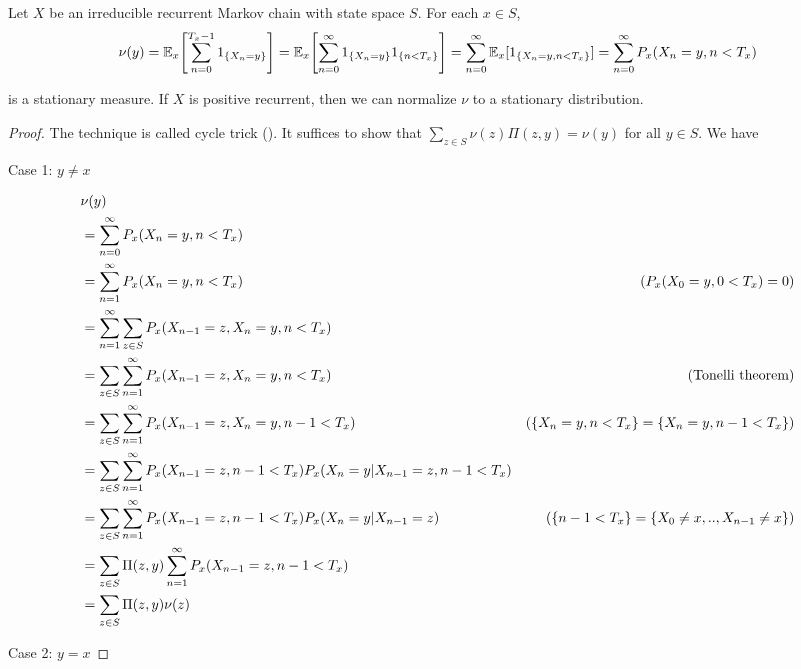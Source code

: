 \documentclass{report}
\begin{document}
\begin{theorem}
    Let $X$ be an irreducible recurrent Markov chain with state space $S$. For each $x \in S$, 
    $$
        \nu(y) = \Exp_x\bracket*{\sum_{n=0}^{T_x - 1} 1_{\set{X_n = y}}} = \Exp_x\bracket*{\sum_{n=0}^\infty 1_{\set{X_n = y}}1_{\set{n < T_x}} } = \sum_{n=0}^\infty \Exp_x[1_{\set{X_n=y, n < T_x}}] = \sum_{n=0}^\infty P_x(X_n=y, n < T_x)
    $$
    
    is a stationary measure. If $X$ is positive recurrent, then we can normalize $\nu$ to a stationary distribution.
\begin{proof}
	The technique is called cycle trick (). It suffices to show that $\sum_{z \in S} \nu(z) \Pi(z, y) = \nu(y)$ for all $y \in S$. We have

	Case 1: $y \neq x$
	
	\begin{align*}
		&\nu(y) \\
		&= \sum_{n=0}^\infty P_x(X_n=y, n < T_x) \\
		&= \sum_{n=1}^\infty P_x(X_n=y, n < T_x) &\text{($P_x(X_0=y, 0 < T_x) = 0$)} \\
		&= \sum_{n=1}^\infty \sum_{z \in S} P_x(X_{n-1} = z, X_n=y, n < T_x) \\
		&= \sum_{z \in S} \sum_{n=1}^\infty P_x(X_{n-1} = z, X_n=y, n < T_x) &\text{(Tonelli theorem)} \\
		&= \sum_{z \in S} \sum_{n=1}^\infty P_x(X_{n-1} = z, X_n=y, n - 1 < T_x) &\text{($\{X_n=y, n < T_x\} = \{X_n=y, n-1 < T_x\}$)}\\
		&= \sum_{z \in S} \sum_{n=1}^\infty P_x(X_{n-1} = z, n - 1 < T_x) P_x(X_n = y | X_{n-1} = z, n-1 < T_x)\\
		&= \sum_{z \in S} \sum_{n=1}^\infty P_x(X_{n-1} = z, n - 1 < T_x) P_x(X_n = y | X_{n-1} = z) &\text{($\{n-1 < T_x\} = \{X_0 \neq x, .., X_{n-1} \neq x\}$)}\\
		&= \sum_{z \in S} \Pi(z, y) \sum_{n=1}^\infty P_x(X_{n-1} = z, n - 1 < T_x) \\
		&= \sum_{z \in S} \Pi(z, y) \nu(z) \\
	\end{align*}
	
	Case 2: $y = x$


\end{proof}
\end{theorem}
\end{document}

